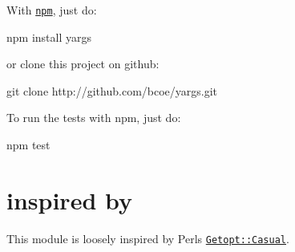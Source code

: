 With \href{http://github.com/isaacs/npm}{\tt npm}, just do\+: \begin{DoxyVerb}npm install yargs
\end{DoxyVerb}


or clone this project on github\+: \begin{DoxyVerb}git clone http://github.com/bcoe/yargs.git
\end{DoxyVerb}


To run the tests with npm, just do\+: \begin{DoxyVerb}npm test
\end{DoxyVerb}


\section*{inspired by }

This module is loosely inspired by Perl\textquotesingle{}s \href{http://search.cpan.org/~photo/Getopt-Casual-0.13.1/Casual.pm}{\tt Getopt\+::\+Casual}. 